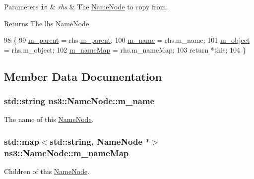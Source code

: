 \begin{DoxyParams}[1]{Parameters}
\mbox{\tt in}  & {\em rhs} & The \hyperlink{classns3_1_1NameNode}{Name\+Node} to copy from. \\
\hline
\end{DoxyParams}
\begin{DoxyReturn}{Returns}
The lhs \hyperlink{classns3_1_1NameNode}{Name\+Node}. 
\end{DoxyReturn}

\begin{DoxyCode}
98 \{
99   \hyperlink{classns3_1_1NameNode_a2c5fdd9118e10047488a9967428d9474}{m\_parent} = rhs.\hyperlink{classns3_1_1NameNode_a2c5fdd9118e10047488a9967428d9474}{m\_parent};
100   \hyperlink{classns3_1_1NameNode_ae028fe25bbe0bde5cbe82a79a260acb9}{m\_name} = rhs.m\_name;
101   \hyperlink{classns3_1_1NameNode_ab5417732c84a06149e0820d35bc85a7c}{m\_object} = rhs.m\_object;
102   \hyperlink{classns3_1_1NameNode_a7fc4cf8060a6182da15ba8eb4c265344}{m\_nameMap} = rhs.m\_nameMap;
103   \textcolor{keywordflow}{return} *\textcolor{keyword}{this};
104 \}
\end{DoxyCode}


\subsection{Member Data Documentation}
\subsubsection[{\texorpdfstring{m\+\_\+name}{m_name}}]{\setlength{\rightskip}{0pt plus 5cm}std\+::string ns3\+::\+Name\+Node\+::m\+\_\+name}\hypertarget{classns3_1_1NameNode_ae028fe25bbe0bde5cbe82a79a260acb9}{}\label{classns3_1_1NameNode_ae028fe25bbe0bde5cbe82a79a260acb9}
The name of this \hyperlink{classns3_1_1NameNode}{Name\+Node}. 
\subsubsection[{\texorpdfstring{m\+\_\+name\+Map}{m_nameMap}}]{\setlength{\rightskip}{0pt plus 5cm}std\+::map$<$std\+::string, {\bf Name\+Node} $\ast$$>$ ns3\+::\+Name\+Node\+::m\+\_\+name\+Map}\hypertarget{classns3_1_1NameNode_a7fc4cf8060a6182da15ba8eb4c265344}{}\label{classns3_1_1NameNode_a7fc4cf8060a6182da15ba8eb4c265344}
Children of this \hyperlink{classns3_1_1NameNode}{Name\+Node}. 
